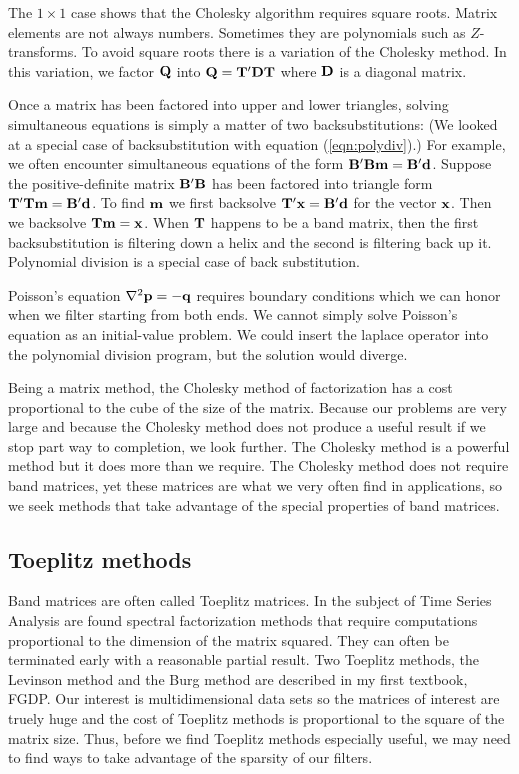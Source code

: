 \par
The $1\times 1$ case shows that the Cholesky algorithm requires square roots.
Matrix elements are not always numbers.
Sometimes they are polynomials such as $Z$-transforms.
To avoid square roots there is a variation
of the Cholesky method.
In this variation, we factor $\bold Q$ into
$\bold Q=\bold T'\bold D\bold T$
where $\bold D$ is a diagonal matrix.

\par
Once a matrix has been factored into upper and lower triangles,
solving simultaneous equations
is simply a matter of two backsubstitutions:
(We looked at a special case of backsubstitution
with equation (\ref{eqn:polydiv}).)
For example, we often encounter simultaneous equations of the form
$\bold B'\bold B\bold m=\bold B'\bold d$.
Suppose the positive-definite matrix
$\bold B'\bold B$ has been factored into triangle form
$\bold T'\bold T\bold m=\bold B'\bold d$.
To find 
$\bold m$
we first backsolve
$\bold T'\bold x=\bold B'\bold d$
for the vector
$\bold x$.
Then we backsolve
$\bold T\bold m=\bold x$.
When
$\bold T$
happens to be a band matrix,
then the first backsubstitution is filtering down a helix
and the second is filtering back up it.
Polynomial division is a special case of back substitution.

\par
Poisson's equation
$\nabla^2 \bold p = -\bold q$
requires boundary conditions which we can honor
when we filter starting from both ends.
We cannot simply solve Poisson's equation as
an initial-value problem.
We could insert the laplace operator
into the polynomial division program,
but the solution would diverge.

\par
Being a matrix method, the Cholesky method of factorization
has a cost proportional to the cube of the size of the matrix.
Because our problems are very large
and because the Cholesky method
does not produce a useful result if we stop part way to completion,
we look further.
The Cholesky method is a powerful method but it does more than we require.
The Cholesky method does not require band matrices,
yet these matrices are what we very often find in applications,
so we seek methods that take advantage of the special properties
of band matrices.

\subsection{Toeplitz methods}
Band matrices are often called Toeplitz matrices.
In the subject of Time Series Analysis are found
spectral factorization methods that require computations
proportional to the dimension of the matrix squared.
They can often be terminated early with a reasonable partial result.
Two Toeplitz methods, the Levinson method
and the Burg method are described in my first textbook, FGDP.
Our interest is multidimensional data sets so
the matrices of interest are truely huge and the cost
of Toeplitz methods is proportional to the square of the matrix size.
Thus, before we find Toeplitz methods
especially useful, we may need to find
ways to take advantage of the sparsity of our filters.

